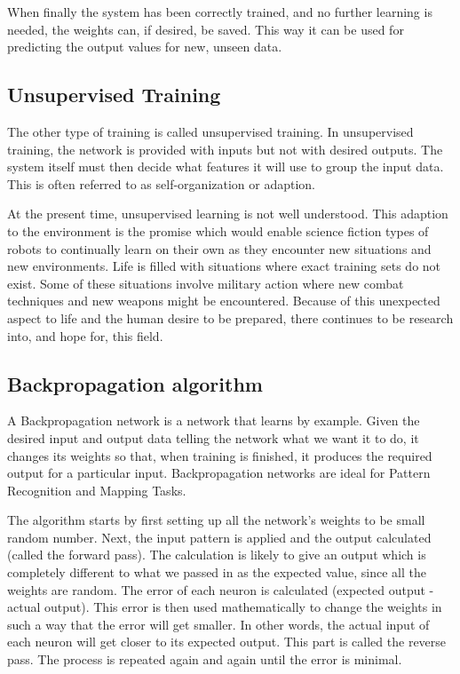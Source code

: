 When finally the system has been correctly trained, and no further learning is needed, the weights can, if desired, be saved. This way it can be used for predicting the output values for new, unseen data.

\vspace{10pt}
\subsection*{Unsupervised Training}

The other type of training is called unsupervised training. In unsupervised training, the network is provided with inputs but not with desired outputs. The system itself must then decide what features it will use to group the input data. This is often referred to as self-organization or adaption.

At the present time, unsupervised learning is not well understood. This adaption to the environment is the promise which would enable science fiction types of robots to continually learn on their own as they encounter new situations and new environments. Life is filled with situations where exact training sets do not exist. Some of these situations involve military action where new combat techniques and new weapons might be encountered. Because of this unexpected aspect to life and the human desire to be prepared, there continues to be research into, and hope for, this field.
\vspace{10pt}

\subsection{Backpropagation algorithm}

A Backpropagation network is a network that learns by example. Given the desired input and output data telling the network what we want it to do, it changes its weights so that, when training is finished, it produces the required output for a particular input. 
Backpropagation networks are ideal for Pattern Recognition and Mapping Tasks.

The algorithm starts by first setting up all the network's weights to be small random number. Next, the input pattern is applied and the output calculated (called the forward pass). The calculation is likely to give an output which is completely different to what we passed in as the expected value, since all the weights are random. The error of each neuron is calculated (expected output - actual output). This error is then used mathematically to change the weights in such a way that the error will get smaller. In other words, the actual input of each neuron will get closer to its expected output. This  part is called the reverse pass. The process is repeated again and again until the error is minimal.

